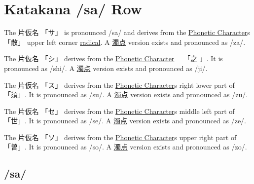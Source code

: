 \section{Katakana /sa/ Row}\label{sec:KatakanaSaRow}


\label{letter:sa} The  片仮名 {「サ」} is pronounced  /sa/ and
derives from the \hyperref[sec:PhoneticCharacter]{Phonetic Character}s {「散」}
upper left corner \hyperref[sec:Radical]{radical}.  A
\hyperref[sec:Dakuten]{濁点} version exists and pronounced as /za/.

\label{letter:shi} The 片仮名 {「シ」} derives from the
\hyperref[sec:PhoneticCharacter]{Phonetic Character}　 {「之 」}.  It is
pronounced as /shi/.  A \hyperref[sec:Dakuten]{濁点} version exists and
pronounced as /ji/.


\label{letter:su} The 片仮名 {「ス」} derives from the
\hyperref[sec:PhoneticCharacter]{Phonetic Character}s right lower part of
{「須」}.  It is pronounced as /su/.  A \hyperref[sec:Dakuten]{濁点} version
exists and pronounced as /zu/. 

\label{letter:se} The 片仮名 {「セ」} derives from the
\hyperref[sec:PhoneticCharacter]{Phonetic Character}s middle left part of
{「世」}.  It is pronounced as /se/.  A \hyperref[sec:Dakuten]{濁点} version
exists and pronounced as /ze/.  

\newpage

\label{letter:so} The 片仮名 {「ソ」} derives from the
\hyperref[sec:PhoneticCharacter]{Phonetic Character}s upper right part of
{「曽」}.  It is pronounced as /so/.  A \hyperref[sec:Dakuten]{濁点} version
exists and pronounced as /zo/.



\newpage
\subsection{/sa/}\label{sec:KatakanaSa}


